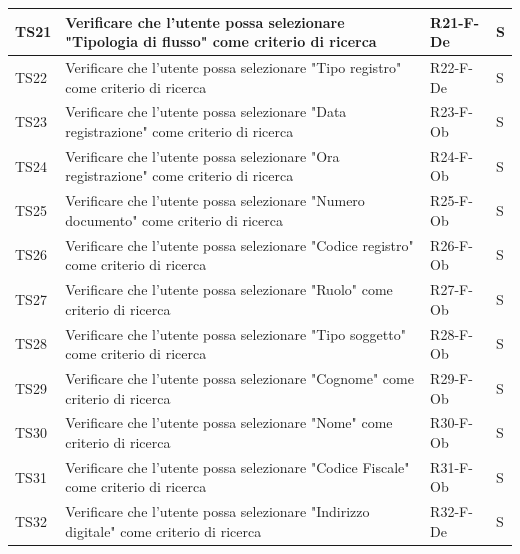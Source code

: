 \documentclass[a4paper,12pt]{article}
\begin{document}
\begin{longtable}{|M{1.2cm}|M{6.3cm}|M{2.5cm}|M{1.5cm}|}
                TS21 & Verificare che l'utente possa selezionare "Tipologia di flusso" come criterio di ricerca & R21-F-De & S \\
                \hline

                TS22 & Verificare che l'utente possa selezionare "Tipo registro" come criterio di ricerca & R22-F-De & S \\
                \hline
               
                TS23 & Verificare che l'utente possa selezionare "Data registrazione" come criterio di ricerca & R23-F-Ob & S \\
                \hline
                
                TS24 & Verificare che l'utente possa selezionare "Ora registrazione" come criterio di ricerca & R24-F-Ob & S \\
                \hline
                
                TS25 & Verificare che l'utente possa selezionare "Numero documento" come criterio di ricerca & R25-F-Ob & S \\
                \hline

                TS26 & Verificare che l'utente possa selezionare "Codice registro" come criterio di ricerca & R26-F-Ob & S \\
                \hline

                TS27 & Verificare che l'utente possa selezionare "Ruolo" come criterio di ricerca & R27-F-Ob & S \\
                \hline

                TS28 & Verificare che l'utente possa selezionare "Tipo soggetto" come criterio di ricerca & R28-F-Ob & S \\
                \hline

                TS29 & Verificare che l'utente possa selezionare "Cognome" come criterio di ricerca & R29-F-Ob & S \\
                \hline

                TS30 & Verificare che l'utente possa selezionare "Nome" come criterio di ricerca & R30-F-Ob & S \\
                \hline

                TS31 & Verificare che l'utente possa selezionare "Codice Fiscale" come criterio di ricerca & R31-F-Ob & S \\
                \hline

                TS32 & Verificare che l'utente possa selezionare "Indirizzo digitale" come criterio di ricerca & R32-F-De & S \\
                \hline


\end{longtable}
\end{document}
